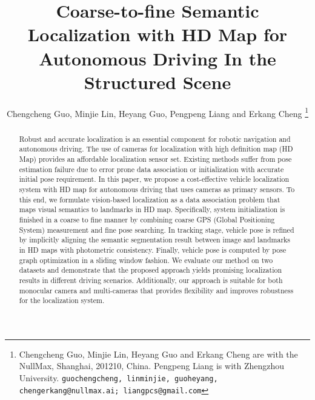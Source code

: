 \documentclass[letterpaper, 10 pt, conference]{ieeeconf}
\title{\LARGE \bf
Coarse-to-fine Semantic Localization with HD Map for Autonomous Driving In the Structured Scene
}
\author{Chengcheng Guo, Minjie Lin, Heyang Guo, Pengpeng Liang and Erkang Cheng%
\thanks{Chengcheng Guo, Minjie Lin, Heyang Guo and Erkang Cheng are with the NullMax, Shanghai, 201210, China. Pengpeng Liang is with Zhengzhou University.
        {\tt\small guochengcheng, linminjie, guoheyang, chengerkang@nullmax.ai; liangpcs@gmail.com}}%
}
\newcommand{\hlr}[1]{{\color{red}{#1}}}
\begin{document}
\maketitle
\thispagestyle{empty}
\pagestyle{empty}


\begin{abstract}
Robust and accurate localization is an essential component for robotic navigation and autonomous driving. The use of cameras for localization with high definition map (HD Map) provides an affordable localization sensor set. Existing methods suffer from pose estimation failure due to error prone data association or initialization with accurate initial pose requirement. In this paper, we propose a cost-effective vehicle localization system with HD map for autonomous driving that uses cameras as primary sensors. To this end, we formulate vision-based localization as a data association problem that maps visual semantics to landmarks in HD map. Specifically, system initialization is finished in a coarse to fine manner by combining coarse GPS (Global Positioning System) measurement and fine pose searching. In tracking stage, vehicle pose is refined by implicitly aligning the semantic segmentation result between image and landmarks in HD maps with photometric consistency. Finally, vehicle pose is computed by pose graph optimization in a sliding window fashion. We evaluate our method on two datasets and demonstrate that the proposed approach yields promising localization results in different driving scenarios. Additionally, our approach is suitable for both monocular camera and multi-cameras that provides flexibility and improves robustness for the localization system. 







\end{abstract}
\end{document}
